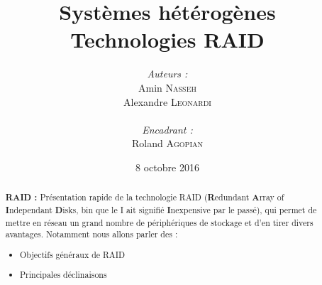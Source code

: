 \documentclass[a4paper,11pt]{article}
\title{
  \textbf{Systèmes hétérogènes}\\
  Technologies RAID
}
\author{
\begin{minipage}{0.4\textwidth}
	\begin{flushleft} \large
		\emph{Auteurs :}\\
                Amin \textsc{Nasseh}\\
		Alexandre \textsc{Leonardi}\\
	\end{flushleft}
\end{minipage}
\begin{minipage}{0.4\textwidth}
	\begin{flushright} \large
		\emph{Encadrant :} \\
		Roland \textsc{Agopian}\\
	\end{flushright}
\end{minipage}
}
\date{8 octobre 2016}
\begin{document}
\maketitle
\thispagestyle{empty}
\begin{abstract}
\textbf{RAID :} Présentation rapide de la technologie RAID (\textbf{R}edundant \textbf{A}rray of \textbf{I}ndependant \textbf{D}isks, bin que le I ait signifié \textbf{I}nexpensive par le passé), qui permet de mettre en réseau un grand nombre de périphériques de stockage et d'en tirer divers avantages. Notamment nous allons parler des :
\begin{itemize}
	\item Objectifs généraux de RAID
    \item Principales déclinaisons 
\end{itemize}
\end{abstract}
\pagebreak

\tableofcontents
\pagebreak



\pagebreak

\pagebreak

\pagebreak

\pagebreak
\nocite{*}

\end{document}
